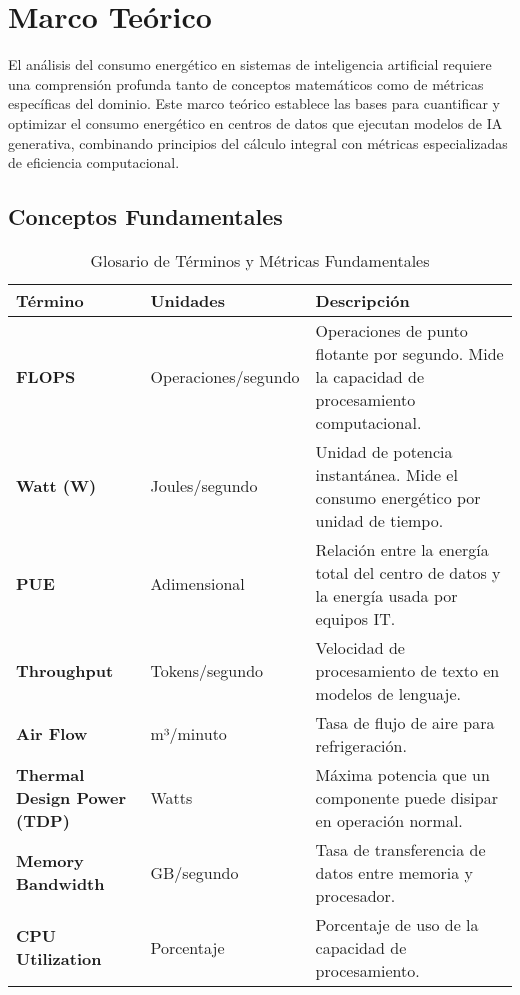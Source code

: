 \section{Marco Teórico}

El análisis del consumo energético en sistemas de inteligencia artificial requiere una comprensión profunda tanto de conceptos matemáticos como de métricas específicas del dominio. Este marco teórico establece las bases para cuantificar y optimizar el consumo energético en centros de datos que ejecutan modelos de IA generativa, combinando principios del cálculo integral con métricas especializadas de eficiencia computacional.

\subsection{Conceptos Fundamentales}

\begin{table}[ht]
\centering
\caption{Glosario de Términos y Métricas Fundamentales}
\begin{tabular}{>{\bfseries}p{2.5cm}p{4cm}p{6cm}}
\toprule
\textbf{Término} & \textbf{Unidades} & \textbf{Descripción} \\
\midrule
FLOPS & Operaciones/segundo & Operaciones de punto flotante por segundo. Mide la capacidad de procesamiento computacional. \\
\addlinespace
Watt (W) & Joules/segundo & Unidad de potencia instantánea. Mide el consumo energético por unidad de tiempo. \\
\addlinespace
PUE & Adimensional & Relación entre la energía total del centro de datos y la energía usada por equipos IT. \\
\addlinespace
Throughput & Tokens/segundo & Velocidad de procesamiento de texto en modelos de lenguaje. \\
\addlinespace
Air Flow & m³/minuto & Tasa de flujo de aire para refrigeración. \\
\addlinespace
Thermal Design Power (TDP) & Watts & Máxima potencia que un componente puede disipar en operación normal. \\
\addlinespace
Memory Bandwidth & GB/segundo & Tasa de transferencia de datos entre memoria y procesador. \\
\addlinespace
CPU Utilization & Porcentaje & Porcentaje de uso de la capacidad de procesamiento. \\
\bottomrule
\end{tabular}
\end{table}

